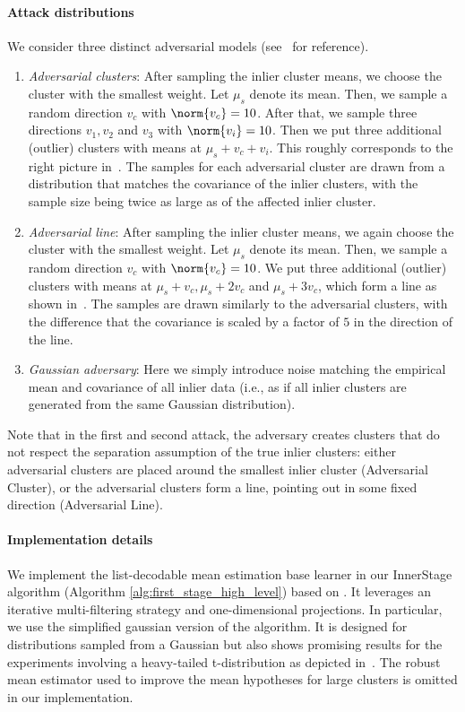 \paragraph{Attack distributions}
We consider three distinct adversarial models (see~ for reference).
\begin{enumerate}
    \item \emph{Adversarial clusters}: After sampling the inlier cluster means, we choose the cluster with the smallest weight. Let \(\mu_s\) denote its mean. Then, we sample a random direction \(v_c\) with \(\norm{v_c} = 10\). After that, we sample three directions \(v_1, v_2\) and \(v_3\) with \(\norm{v_i} = 10\). Then we put three additional (outlier) clusters with means at \(\mu_s + v_c + v_i\). This roughly corresponds to the right picture in~. The samples for each adversarial cluster are drawn from a distribution that matches the covariance of the inlier clusters, with the sample size being twice as large as of the affected inlier cluster.
    \item \emph{Adversarial line}: After sampling the inlier cluster means, we again choose the cluster with the smallest weight.
    Let \(\mu_s\) denote its mean. Then, we sample a random direction \(v_c\) with \(\norm{v_c} = 10\). 
    We put three additional (outlier) clusters with means at \(\mu_s + v_c, \mu_s + 2 v_c\) and \(\mu_s + 3v_c\), which form a line as shown in~. The samples are drawn similarly to the adversarial clusters, with the difference that the covariance is scaled by a factor of \(5\) in the direction of the line.
    \item \emph{Gaussian adversary}: Here we simply introduce noise matching the empirical mean and covariance of all inlier data (i.e., as if all inlier clusters are generated from the same Gaussian distribution).
\end{enumerate}
Note that in the first and second attack, the adversary creates clusters that do not respect the separation assumption of the true inlier clusters: either adversarial clusters are placed around the smallest inlier cluster (\textrm{Adversarial Cluster}), or the adversarial clusters form a line, pointing out in some fixed direction (\textrm{Adversarial Line}).

\paragraph{Implementation details}
We implement the list-decodable mean estimation base learner in our InnerStage algorithm (Algorithm \ref{alg:first_stage_high_level}) based on \cite{diakonikolas2022clustering}. It leverages an iterative multi-filtering strategy and one-dimensional projections. In particular, we use the simplified gaussian version of the algorithm. It is designed for distributions sampled from a Gaussian but also shows promising results for the experiments involving a heavy-tailed t-distribution as depicted in~. The robust mean estimator used to improve the mean hypotheses for large clusters is omitted in our implementation.


